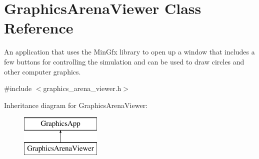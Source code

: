 \hypertarget{class_graphics_arena_viewer}{}\section{Graphics\+Arena\+Viewer Class Reference}
\label{class_graphics_arena_viewer}


An application that uses the Min\+Gfx library to open up a window that includes a few buttons for controlling the simulation and can be used to draw circles and other computer graphics.  




{\ttfamily \#include $<$graphics\+\_\+arena\+\_\+viewer.\+h$>$}

Inheritance diagram for Graphics\+Arena\+Viewer\+:\begin{figure}[H]
\begin{center}
\leavevmode
\includegraphics[height=2.000000cm]{class_graphics_arena_viewer}
\end{center}
\end{figure}
